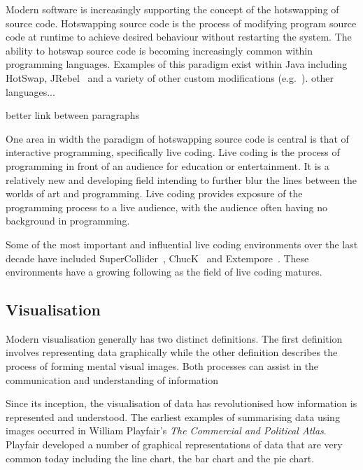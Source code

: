 Modern software is increasingly supporting the concept of the hotswapping of source code. Hotswapping source code is the process of modifying program source code at runtime to achieve desired behaviour without restarting the system. The ability to hotswap source code is becoming increasingly common within programming languages. Examples of this paradigm exist within Java including HotSwap, JRebel~\cite{ZeroTurnaround2014} and a variety of other custom modifications (e.g.~\cite{Thomas2011}). {\color{red} other languages...}

{\color{red} better link between paragraphs}

One area in width the paradigm of hotswapping source code is central is that of interactive programming, specifically live coding. Live coding is the process of programming in front of an audience for education or entertainment. It is a relatively new and developing field intending to further blur the lines between the worlds of art and programming. Live coding provides exposure of the programming process to a live audience, with the audience often having no background in programming.

Some of the most important and influential live coding environments over the last decade have included SuperCollider~\cite{McCartney}, ChucK~\cite{Wang2008} and Extempore~\cite{Sorensen}. These environments have a growing following as the field of live coding matures.


\subsection{Visualisation}

Modern visualisation generally has two distinct definitions. The first definition involves representing data graphically while the other definition describes the process of forming mental visual images. {\color{red} Both processes can assist in the communication and understanding of information}

Since its inception, the visualisation of data has revolutionised how information is represented and understood. The earliest examples of summarising data using images occurred in William Playfair's \textit{The Commercial and Political Atlas}. Playfair developed a number of graphical representations of data that are very common today including the line chart, the bar chart and the pie chart.

